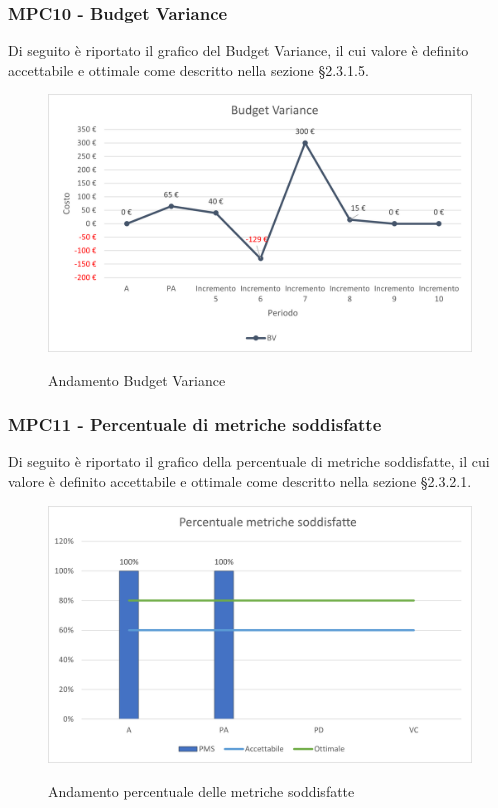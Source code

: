 \subsubsection{MPC10 - Budget Variance}
Di seguito è riportato il grafico del Budget Variance, il cui valore è definito accettabile e ottimale come descritto nella sezione §2.3.1.5.\\

\begin{figure}[H]
\centering
\includegraphics[scale=0.78]{res/ResocontoAttivitaDiVerifica/res/metriche/grafici/img/budgetVariance.png}\\
\caption{Andamento Budget Variance}
\end{figure}


\subsubsection{MPC11 - Percentuale di metriche soddisfatte}
Di seguito è riportato il grafico della percentuale di metriche soddisfatte, il cui valore è definito accettabile e ottimale come descritto nella sezione §2.3.2.1.\\

\begin{figure}[H]
\centering
\includegraphics[scale=0.78]{res/ResocontoAttivitaDiVerifica/res/metriche/grafici/img/metricheSoddisfatte.png}\\
\caption{Andamento percentuale delle metriche soddisfatte}
\end{figure}


